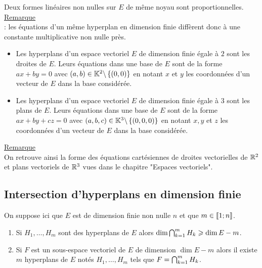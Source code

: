\begin{defprop}
    Deux formes linéaires non nulles sur \(E\) de même noyau sont proportionnelles.\\
    \underline{Remarque}\\ : 
    les équations d’un même hyperplan en dimension finie diffèrent donc à une constante multiplicative non nulle près.
\end{defprop}

\begin{defprop}
    \begin{itemize}
        \item Les hyperplans d’un espace vectoriel \(E\) de dimension finie égale à \(2\) sont les droites de \(E\). Leurs équations dans une base de \(E\) sont de la forme \(ax + by = 0\) avec \((a, b) \in  \mathbb{K}^2 \backslash \left\lbrace(0, 0)\right\rbrace\) en notant \(x\) et \(y\) les coordonnées d’un vecteur de \(E\) dans la base considérée.
        \item Les hyperplans d’un espace vectoriel \(E\) de dimension finie égale à \(3\) sont les plans de \(E\). Leurs équations dans une base de \(E\) sont de la forme \(ax + by + cz = 0\) avec \((a, b, c) \in  \mathbb{K}^3 \backslash \left\lbrace(0, 0, 0)\right\rbrace\) en notant \(x, y\) et \(z\) les coordonnées d’un vecteur de \(E\) dans la base considérée.
    \end{itemize}
    \underline{Remarque}\\
    On retrouve ainsi la forme des équations cartésiennes de droites vectorielles de \(\mathbb{R}^2\) et plans vectoriels de \(\mathbb{R}^3\) vues dans le chapitre "Espaces vectoriels".
\end{defprop}
\subsection{Intersection d’hyperplans en dimension finie}
    On suppose ici que \(E\) est de dimension finie non nulle \(n\) et que \(m \in \left\llbracket1;n\right\rrbracket\).

\begin{theo}
    \begin{enumerate}
        \item Si \(H_1, \dots , H_m\) sont des hyperplans de \(E\) alors \(\dim \bigcap^{m}_{k=1}H_k \geqslant \dim E - m\).
        \item Si \(F\) est un sous-espace vectoriel de \(E\) de dimension \(\dim E - m\) alors il existe \(m\) hyperplans de \(E\) notés \(H_1, \dots , H_m\) tels que \(F =\bigcap^m_{k=1}H_k\).
    \end{enumerate}
\end{theo}


